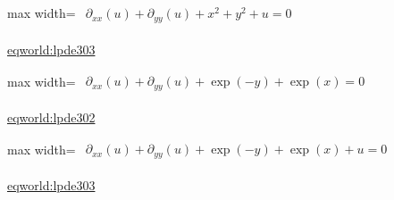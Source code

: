 \documentclass[UTF8,10pt,a4paper,fontset=mac]{ctexart}
\begin{document}
\begin{minipage}{\linewidth}\begin{center}\begin{adjustbox}{max width=\linewidth}$\displaystyle\begin{gathered}\begin{gathered}\partial_{xx}(u)+\partial_{yy}(u)+x^{2}+y^{2}+u=0\end{gathered}\end{gathered}$\end{adjustbox}\end{center}{\small\href{https://eqworld.ipmnet.ru/en/solutions/lpde/lpde303.pdf}{eqworld:lpde303}}\par\end{minipage}\par\vspace{6mm}

\begin{minipage}{\linewidth}\begin{center}\begin{adjustbox}{max width=\linewidth}$\displaystyle\begin{gathered}\begin{gathered}\partial_{xx}(u)+\partial_{yy}(u)+\exp(-y)+\exp(x)=0\end{gathered}\end{gathered}$\end{adjustbox}\end{center}{\small\href{https://eqworld.ipmnet.ru/en/solutions/lpde/lpde302.pdf}{eqworld:lpde302}}\par\end{minipage}\par\vspace{6mm}

\begin{minipage}{\linewidth}\begin{center}\begin{adjustbox}{max width=\linewidth}$\displaystyle\begin{gathered}\begin{gathered}\partial_{xx}(u)+\partial_{yy}(u)+\exp(-y)+\exp(x)+u=0\end{gathered}\end{gathered}$\end{adjustbox}\end{center}{\small\href{https://eqworld.ipmnet.ru/en/solutions/lpde/lpde303.pdf}{eqworld:lpde303}}\par\end{minipage}\par\vspace{6mm}
\end{document}
